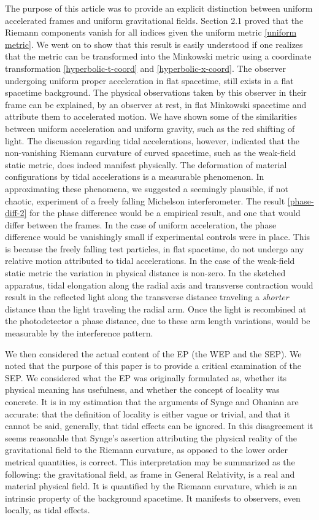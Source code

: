 \documentclass[11pt]{article}
\begin{document}
The purpose of this article was to provide an explicit distinction between uniform accelerated frames and uniform gravitational fields. Section 2.1 proved that the Riemann components vanish for all indices given the uniform metric \eqref{uniform metric}. We went on to show that this result is easily understood if one realizes that the metric can be transformed into the Minkowski metric using a coordinate transformation \eqref{hyperbolic-t-coord} and \eqref{hyperbolic-x-coord}. The observer undergoing uniform proper acceleration in flat spacetime, still exists in a flat spacetime background. The physical observations taken by this observer in their frame can be explained, by an observer at rest, in flat Minkowski spacetime and attribute them to accelerated motion. We have shown some of the similarities between uniform acceleration and uniform gravity, such as the red shifting of light. The discussion regarding tidal accelerations, however, indicated that the non-vanishing Riemann curvature of curved spacetime, such as the weak-field static metric, does indeed manifest physically. The deformation of material configurations by tidal accelerations is a measurable phenomenon. In approximating these phenomena, we suggested a seemingly plausible, if not chaotic, experiment of a freely falling Michelson interferometer. The result \eqref{phase-diff-2} for the phase difference would be a empirical result, and one that would differ between the frames. In the case of uniform acceleration, the phase difference would be vanishingly small if experimental controls were in place. This is because the freely falling test particles, in flat spacetime, do not undergo any relative motion attributed to tidal accelerations. In the case of the weak-field static metric the variation in physical distance is non-zero. In the sketched apparatus, tidal elongation along the radial axis and transverse contraction would result in the reflected light along the transverse distance traveling a \textit{shorter} distance than the light traveling the radial arm. Once the light is recombined at the photodetector a phase distance, due to these arm length variations, would be measurable by the interference pattern. 

We then considered the actual content of the EP (the WEP and the SEP). We noted that the purpose of this paper is to provide a critical examination of the SEP. We considered what the EP was originally formulated as, whether its physical meaning has usefulness, and whether the concept of locality was concrete. It is in my estimation that the arguments of Synge and Ohanian are accurate: that the definition of locality is either vague or trivial, and that it cannot be said, generally, that tidal effects can be ignored. In this disagreement it seems reasonable that Synge's assertion attributing the physical reality of the gravitational field to the Riemann curvature, as opposed to the lower order metrical quantities, is correct. This interpretation may be summarized as the following: the gravitational field, as frame in General Relativity, is a real and material physical field. It is quantified by the Riemann curvature, which is an intrinsic property of the background spacetime. It manifests to observers, even locally, as tidal effects. 
\end{document}
